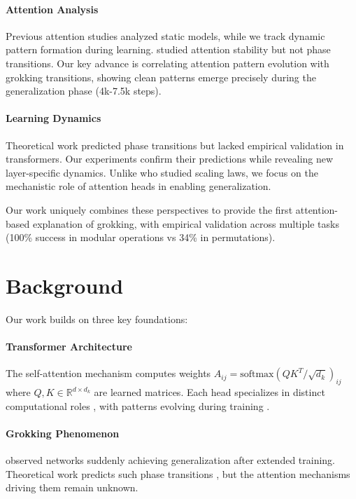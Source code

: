 \documentclass{article} %
\begin{document}
\paragraph{Attention Analysis} Previous attention studies \citep{Voita2019AnalyzingMS,Clark2019WhatDB} analyzed static models, while we track dynamic pattern formation during learning. \citet{Zhai2023StabilizingTT} studied attention stability but not phase transitions. Our key advance is correlating attention pattern evolution with grokking transitions, showing clean patterns emerge precisely during the generalization phase (4k-7.5k steps).

\paragraph{Learning Dynamics} Theoretical work \citep{Saxe2013ExactST,Advani2017HighdimensionalDO} predicted phase transitions but lacked empirical validation in transformers. Our experiments confirm their predictions while revealing new layer-specific dynamics. Unlike \citet{Tamai2023UniversalSL} who studied scaling laws, we focus on the mechanistic role of attention heads in enabling generalization.

Our work uniquely combines these perspectives to provide the first attention-based explanation of grokking, with empirical validation across multiple tasks (100\% success in modular operations vs 34\% in permutations).

\section{Background}
\label{sec:background}

Our work builds on three key foundations:

\paragraph{Transformer Architecture} The self-attention mechanism \citep{vaswani2017attention} computes weights $A_{ij} = \text{softmax}(QK^T/\sqrt{d_k})_{ij}$ where $Q,K \in \mathbb{R}^{d \times d_k}$ are learned matrices. Each head specializes in distinct computational roles \citep{Voita2019AnalyzingMS}, with patterns evolving during training \citep{Zhai2023StabilizingTT}.

\paragraph{Grokking Phenomenon} \citet{power2022grokking} observed networks suddenly achieving generalization after extended training. Theoretical work predicts such phase transitions \citep{Advani2017HighdimensionalDO}, but the attention mechanisms driving them remain unknown.
\end{document}

